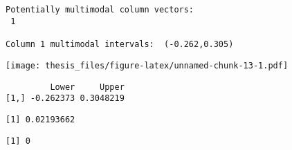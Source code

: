 \documentclass[12pt,twoside]{dukestatscithesis}
\theoremstyle{definition}
\theoremstyle{definition}
\theoremstyle{definition}
\theoremstyle{remark}
\begin{document}
\begin{verbatim}


Potentially multimodal column vectors:
 1 

Column 1 multimodal intervals:  (-0.262,0.305) 
\end{verbatim}
\texttt{[image: thesis\_files/figure-latex/unnamed-chunk-13-1.pdf]}
\begin{verbatim}
         Lower     Upper
[1,] -0.262373 0.3048219
\end{verbatim}
\begin{Shaded}
\begin{Highlighting}[]
\OperatorTok{$}\OperatorTok{$}\OperatorTok{$}
\end{Highlighting}
\end{Shaded}
\begin{verbatim}
[1] 0.02193662
\end{verbatim}
\begin{Shaded}
\begin{Highlighting}[]
\OperatorTok{$}\OperatorTok{$}\OperatorTok{$}
\end{Highlighting}
\end{Shaded}
\begin{verbatim}
[1] 0
\end{verbatim}
\begin{Shaded}
\begin{Highlighting}[]
\StringTok{ }
\OperatorTok{$}
\OperatorTok{$}\StringTok{ }\NormalTok{(}\OperatorTok{$}
\StringTok{ }\NormalTok{(}
                    \NormalTok{, }\NormalTok{(}\NormalTok{, }\NormalTok{, }\NormalTok{,}\NormalTok{,}\NormalTok{),}
                    \NormalTok{)}
\end{Highlighting}
\end{Shaded}
\end{document}
